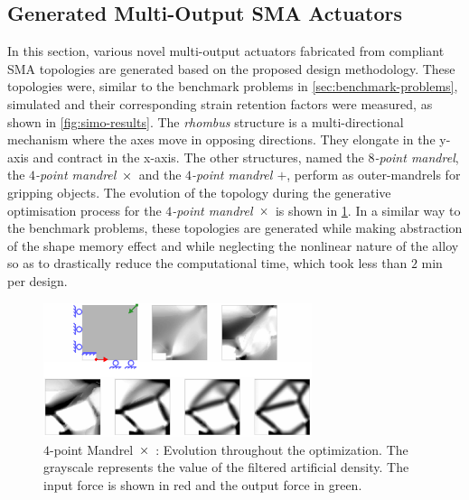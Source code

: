 \subsection{Generated Multi-Output SMA Actuators}
In this section, various novel multi-output actuators fabricated from compliant SMA topologies are generated based on the proposed design methodology. These topologies were, similar to the benchmark problems in \cref{sec:benchmark-problems}, simulated and their corresponding strain retention factors were measured, as shown in \cref{fig:simo-results}. The \textit{rhombus} structure is a multi-directional mechanism where the axes move in opposing directions. They elongate in the y-axis and contract in the x-axis. The other structures, named the \textit{$8$-point mandrel}, the \textit{$4$-point mandrel $\Xsymbol$} and the \textit{$4$-point mandrel $+$}, perform as outer-mandrels for gripping objects. The evolution of the topology during the generative optimisation process for the \textit{$4$-point mandrel $\Xsymbol$} is shown in \cref{fig:TopologyEvolution-mandrel}. In a similar way to the benchmark problems, these topologies are generated while making abstraction of the shape memory effect and while neglecting the nonlinear nature of the alloy so as to drastically reduce the computational time, which took less than $2$ min per design.
\begin{figure}[hbt!]
    \centering
    \includegraphics[width=0.7\textwidth]{images/chap5/06_final_evolve_mandrel_2.pdf}
    \caption[$4$-point Mandrel $\Xsymbol$ : Evolution throughout the optimization]{$4$-point Mandrel $\Xsymbol$ : Evolution throughout the optimization. The grayscale represents the value of the filtered artificial density. The input force is shown in red and the output force in green.}
    \label{fig:TopologyEvolution-mandrel}
\end{figure}

